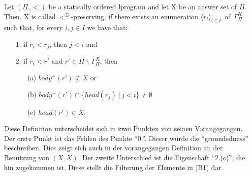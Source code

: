\begin{definition}
  Let $(\Pi, <)$ be a statically ordered lprogram and let X be an answer set of $\Pi$.
  Then, X is called $<^B$-preserving, if there exists an enumeration
  $\langle r_i \rangle_{i \in I}$~of~$\Gamma_{\Pi}^X$ such that, for every $i, j \in I$
  we have that:
  \begin{itemize}
		\item[1.] if $r_i < r_j$, then $j<i$ and \\
    \item[2.] if $r_i < r'$ and $r' \in \Pi \backslash \Gamma_{\Pi}^X$, then
      \begin{itemize}
        \item[(a)] $body^+(r') \not \subseteq X$ or
        \item[(b)] $body^-(r') \cap \{head(r_j)~|~j<i\} \not = \emptyset$
				\item[(c)] $head(r') \in X.$
      \end{itemize}
  \end{itemize}
\end{definition}

Diese Definition unterscheidet sich in zwei Punkten von seinen Vorangegangen. Der erste Punkt ist das Fehlen des Punkte ``0.''. Dieser würde die ``groundedness'' beschreiben. Dies zeigt sich auch in der vorangegangen Definition an der Benutzung von $(X,X)$. Der zweite Unterschied ist die Eigenschaft ``2.(c)'', die hin zugekommen ist. Diese stellt die Filterung der Elemente in (B1) dar.